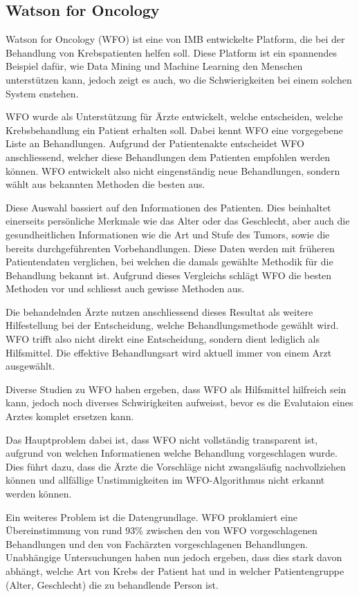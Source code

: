 \subsection{Watson for Oncology}
Watson for Oncology (WFO) ist eine von IMB entwickelte Platform, die bei der Behandlung von Krebspatienten helfen soll. Diese Platform ist ein spannendes Beispiel dafür, wie Data Mining und Machine Learning den Menschen unterstützen kann, jedoch zeigt es auch, wo die Schwierigkeiten bei einem solchen System enstehen.

WFO wurde als Unterstützung für Ärzte entwickelt, welche entscheiden, welche Krebsbehandlung ein Patient erhalten soll. Dabei kennt WFO eine vorgegebene Liste an Behandlungen. Aufgrund der Patientenakte entscheidet WFO anschliessend, welcher diese Behandlungen dem Patienten empfohlen werden können. WFO entwickelt also nicht eingenständig neue Behandlungen, sondern wählt aus bekannten Methoden die besten aus.

Diese Auswahl bassiert auf den Informationen des Patienten. Dies beinhaltet einerseits persönliche Merkmale wie das Alter oder das Geschlecht, aber auch die gesundheitlichen Informationen wie die Art und Stufe des Tumors, sowie die bereits durchgeführenten Vorbehandlungen.
Diese Daten werden mit früheren Patientendaten verglichen, bei welchen die damals gewählte Methodik für die Behandlung bekannt ist. Aufgrund dieses Vergleichs schlägt WFO die besten Methoden vor und schliesst auch gewisse Methoden aus.

Die behandelnden Ärzte nutzen anschliessend dieses Resultat als weitere Hilfestellung bei der Entscheidung, welche Behandlungsmethode gewählt wird.
WFO trifft also nicht direkt eine Entscheidung, sondern dient lediglich als Hilfsmittel. Die effektive Behandlungsart wird aktuell immer von einem Arzt ausgewählt.

Diverse Studien zu WFO haben ergeben, dass WFO als Hilfsmittel hilfreich sein kann, jedoch noch diverses Schwirigkeiten aufweisst, bevor es die Evalutaion eines Arztes komplet ersetzen kann.

Das Hauptproblem dabei ist, dass WFO nicht vollständig transparent ist, aufgrund von welchen Informatienen welche Behandlung vorgeschlagen wurde. 
Dies führt dazu, dass die Ärzte die Vorschläge nicht zwangsläufig nachvollziehen können und allfällige Unstimmigkeiten im WFO-Algorithmus nicht erkannt werden können.

Ein weiteres Problem ist die Datengrundlage. WFO proklamiert eine Übereinstimmung von rund 93\% zwischen den von WFO vorgeschlagenen Behandlungen und den von Fachärzten vorgeschlagenen Behandlungen.
Unabhängige Untersuchungen haben nun jedoch ergeben, dass dies stark davon abhängt, welche Art von Krebs der Patient hat und in welcher Patientengruppe (Alter, Geschlecht) die zu behandlende Person ist. \cite{wfo1} \cite{wfo2} \cite{wfo3}


